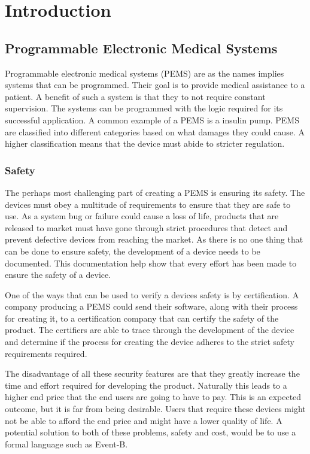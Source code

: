 \section{Introduction}
\subsection{Programmable Electronic Medical Systems}
Programmable electronic medical systems (PEMS) are as the names implies systems that can be programmed. Their goal is to provide medical assistance to a patient. A benefit of such a system is that they to not require constant supervision. The systems can be programmed with the logic required for its successful application. A common example of a PEMS is a insulin pump. PEMS are classified into different categories based on what damages they could cause. A higher classification means that the device must abide to stricter regulation.

\subsubsection{Safety}
The perhaps most challenging part of creating a PEMS is ensuring its safety. The devices must obey a multitude of requirements to ensure that they are safe to use. As a system bug or failure could cause a loss of life, products that are released to market must have gone through strict procedures that detect and prevent defective devices from reaching the market. As there is no one thing that can be done to ensure safety, the development of a device needs to be documented. This documentation help show that every effort has been made to ensure the safety of a device.

One of the ways that can be used to verify a devices safety is by certification. A company producing a PEMS could send their software, along with their process for creating it, to a certification company that can certify the safety of the product. The certifiers are able to trace through the development of the device and determine if the process for creating the device adheres to the strict safety requirements required. 

The disadvantage of all these security features are that they greatly increase the time and effort required for developing the product. Naturally this leads to a higher end price that the end users are going to have to pay. This is an expected outcome, but it is far from being desirable. Users that require these devices might not be able to afford the end price and might have a lower quality of life. A potential solution to both of these problems, safety and cost, would be to use a formal language such as Event-B.

